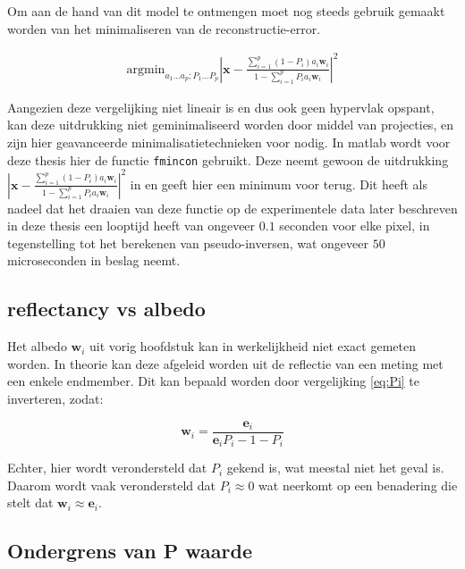 \documentclass[12pt]{report}
\begin{document}
Om aan de hand van dit model te ontmengen moet nog steeds gebruik gemaakt worden van het minimaliseren van de reconstructie-error. 

\begin{align}
\text{argmin}_{a_1 ... a_p; P_1 ... P_p} \left| \bm{x} - \frac{\sum_{i=1}^p (1-P_i) a_{i} \bm{w}_{i}}{1-\sum_{i=1}^p P_i a_{i} \bm{w}_{i}} \right|^2
\end{align}

Aangezien deze vergelijking niet lineair is en dus ook geen hypervlak opspant, kan deze uitdrukking niet geminimaliseerd worden door middel van projecties, en zijn hier geavanceerde minimalisatietechnieken voor nodig. In matlab\cite{MATLAB} wordt voor deze thesis hier de functie \texttt{fmincon} gebruikt. Deze neemt gewoon de uitdrukking $\left| \bm{x} - \frac{\sum_{i=1}^p (1-P_i) a_{i} \bm{w}_{i}}{1-\sum_{i=1}^p P_i a_{i} \bm{w}_{i}} \right|^2$ in en geeft hier een minimum voor terug. Dit heeft als nadeel dat het draaien van deze functie op de experimentele data later beschreven in deze thesis een looptijd heeft van ongeveer $0.1$ seconden voor elke pixel, in tegenstelling tot het berekenen van pseudo-inversen, wat ongeveer $50$ microseconden in beslag neemt. 

\subsection{reflectancy vs albedo}

Het albedo  $\bm{w}_i$ uit vorig hoofdstuk kan in werkelijkheid niet exact gemeten worden. In theorie kan deze afgeleid worden uit de reflectie van een meting met een enkele endmember. Dit kan bepaald worden door vergelijking \ref{eq:Pi} te inverteren, zodat:

\begin{equation}
\bm{w}_i = \frac{\bm{e}_i}{\bm{e}_iP_i - 1 - P_i}
\end{equation}

Echter, hier wordt verondersteld dat $P_i$ gekend is, wat meestal niet het geval is. Daarom wordt vaak verondersteld dat $P_i \approx 0$ wat neerkomt op een benadering die stelt dat $\bm{w}_i \approx \bm{e}_i$. 

\subsection{Ondergrens van P waarde}
\end{document}
